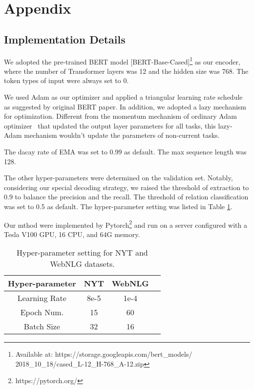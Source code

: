 \documentclass[11pt,a4paper]{article}
\begin{document}



\clearpage
\section{Appendix}
\subsection{Implementation Details}\label{ass:id}
We adopted the pre-trained BERT model [BERT-Base-Cased]\footnote{Available at: https://storage.googleapis.com/bert\_models/\\2018\_10\_18/cased\_L-12\_H-768\_A-12.zip} as our encoder, where the number of Transformer layers was 12 and the hidden size was 768. The token types of input were always set to 0. 

We used Adam as our optimizer and applied a triangular learning rate schedule as suggested by original BERT paper. In addition, we adopted a lazy mechanism for optimization. Different from the momentum mechanism of ordinary Adam optimizer~\cite{kingma2015adam} that updated the output layer parameters for all tasks, this lazy-Adam mechanism wouldn't update the parameters of non-current tasks. 

The dacay rate  of EMA was set to 0.99 as default. The max sequence length was 128.

The other hyper-parameters were determined on the validation set. Notably, considering our special decoding strategy, we raised the threshold of extraction to 0.9 to balance the precision and the recall. The threshold of relation classification was set to 0.5 as default. The hyper-parameter setting was listed in Table \ref{table:res_hyperpara_appendix}. 

Our mthod were implemented by Pytorch\footnote{https://pytorch.org/} and run on a server configured with a Tesla V100 GPU, 16 CPU, and 64G memory.

\begin{table}[htbp]
\centering
\begin{tabular}{c|ccc}
\toprule[1pt]
Hyper-parameter & NYT & WebNLG \\
\hline
Learning Rate & 8e-5 & 1e-4 \\
Epoch Num. & 15 & 60 \\
Batch Size & 32 & 16 \\
\bottomrule[1pt]
\end{tabular}
\caption{Hyper-parameter setting for NYT and WebNLG datasets. }
\label{table:res_hyperpara_appendix}
\end{table}
\end{document}
